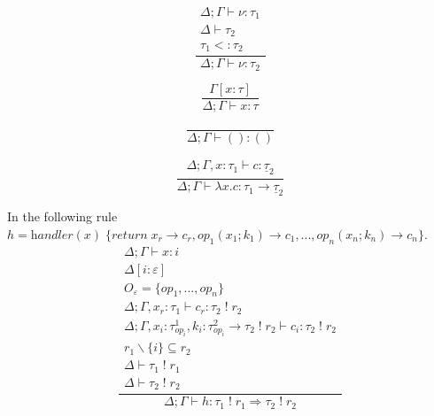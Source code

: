 \documentclass[12pt]{article}
\newcommand\eff[0]{\varepsilon}
\newcommand\Op[0]{O}
\newcommand\op[0]{op}
\newcommand\pty[1]{\ty^1_{#1}}
\newcommand\rty[1]{\ty^2_{#1}}
\newcommand\ty[0]{\tau}
\newcommand\tunit[0]{()}
\newcommand\tarr[2]{#1 \rightarrow #2}
\newcommand\thandler[2]{#1 \Rightarrow #2}
\newcommand\cty[0]{\underline{\ty}}
\newcommand\aty[2]{#1 \; ! \; #2}
\newcommand\val[0]{\nu}
\newcommand\vunit[0]{()}
\newcommand\vabs[2]{\lambda #1 . #2}
\newcommand\vhandleri[2]{\textit{handler} ( #1 ) \; \{#2\}}
\newcommand\comp[0]{c}
\newcommand\subty[2]{#1 <: #2}
\begin{document}
\begin{minipage}{0.25\textwidth}
\[\frac{
	\begin{array}{l}
	\Delta;\Gamma \vdash \val : \ty_1 \\
	\Delta \vdash \ty_2 \\
	\subty{\ty_1}{\ty_2}
	\end{array}
}{
	\Delta;\Gamma \vdash \val : \ty_2
}\]
\end{minipage}
\begin{minipage}{0.25\textwidth}
\[\frac{
	\Gamma[x : \ty]
}{
	\Delta;\Gamma \vdash x : \ty
}\]
\end{minipage}
\begin{minipage}{0.25\textwidth}
\[\frac{
}{
	\Delta;\Gamma \vdash \vunit : \tunit
}\]
\end{minipage}
\begin{minipage}{0.25\textwidth}
\[\frac{
	\begin{array}{l}
	\Delta;\Gamma, x : \ty_1 \vdash \comp : \cty_2
	\end{array}
}{
	\Delta;\Gamma \vdash \vabs{x}{\comp} : \tarr{\ty_1}{\cty_2}
}\]
\end{minipage}

\vspace{10pt}
In the following rule \\$h = 
	\vhandleri{x}{
		\textit{return} \; x_r \rightarrow \comp_r,
		\op_1(x_1 ; k_1) \rightarrow \comp_1,
		...,
		\op_n(x_n ; k_n) \rightarrow \comp_n
	}$.
\[\frac{
	\begin{array}{l}
	\Delta;\Gamma \vdash x : i \\
	\Delta[i : \eff] \\
	\Op_\eff = \{ op_1, ..., op_n \} \\
	\Delta;\Gamma, x_r : \ty_1 \vdash \comp_r : \aty{\ty_2}{r_2} \\
	\Delta;\Gamma, x_i : \pty{\op_i}, k_i : \tarr{\rty{\op_i}}{\aty{\ty_2}{r_2}} \vdash \comp_i : \aty{\ty_2}{r_2} \\
	r_1 \backslash \{ i \} \subseteq r_2 \\
	\Delta \vdash \aty{\ty_1}{r_1} \\
	\Delta \vdash \aty{\ty_2}{r_2}
	\end{array}
}{
	\Delta;\Gamma \vdash h :
	\thandler{\aty{\ty_1}{r_1}}{\aty{\ty_2}{r_2}}
}\]

\end{document}
